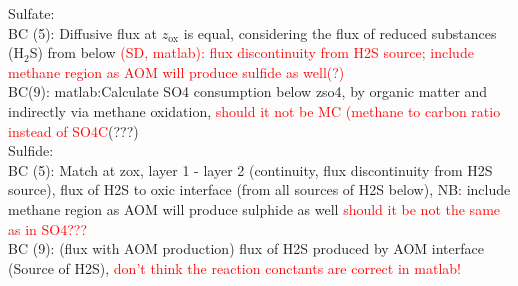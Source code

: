 \documentclass[gmd, manuscript]{copernicus}
\begin{document}
Sulfate:\\
BC (5): Diffusive flux at $z_{\mathrm{ox}}$ is equal, considering the flux of reduced substances (H$_2$S) from below 
\textcolor{red}{(SD, matlab): flux discontinuity from H2S source; include methane region as AOM will produce sulfide as well(?)} \\
BC(9): matlab:Calculate SO4 consumption below zso4, by organic matter and indirectly via methane oxidation, \textcolor{red}{should it not be MC (methane to carbon ratio instead of SO4C}(???) \\

Sulfide:\\
BC (5): Match at zox, layer 1 - layer 2 (continuity, flux discontinuity from H2S source), flux of H2S to oxic interface (from all sources of H2S below), 
NB: include methane region as AOM will produce sulphide as well \textcolor{red}{should it be not the same as in SO4???}\\
BC (9): (flux with AOM production) flux of H2S produced by AOM interface (Source of H2S), \textcolor{red}{don't think the reaction conctants are correct in matlab!}


\end{document}
